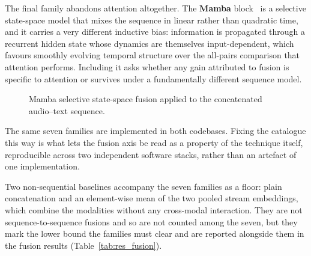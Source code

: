 \documentclass[a4paper,12pt]{article}
\begin{document}
The final family abandons attention altogether. The \textbf{Mamba} block~\cite{gu2023mamba} is a selective state-space model that mixes the sequence in linear rather than quadratic time, and it carries a very different inductive bias: information is propagated through a recurrent hidden state whose dynamics are themselves input-dependent, which favours smoothly evolving temporal structure over the all-pairs comparison that attention performs. Including it asks whether any gain attributed to fusion is specific to attention or survives under a fundamentally different sequence model.

\begin{figure}[ht]
\centering
{}
\caption{Mamba selective state-space fusion applied to the concatenated audio--text sequence.}
\label{fig:mamba_fusion}
\end{figure}

The same seven families are implemented in both codebases. Fixing the catalogue this way is what lets the fusion axis be read as a property of the technique itself, reproducible across two independent software stacks, rather than an artefact of one implementation.

Two non-sequential baselines accompany the seven families as a floor: plain concatenation and an element-wise mean of the two pooled stream embeddings, which combine the modalities without any cross-modal interaction. They are not sequence-to-sequence fusions and so are not counted among the seven, but they mark the lower bound the families must clear and are reported alongside them in the fusion results (Table~\ref{tab:res_fusion}).
\end{document}
